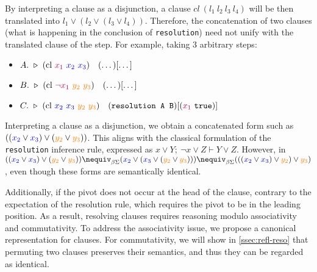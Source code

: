 \begin{remark}
By interpreting a clause as a disjunction, a clause $cl~(l_1~l_2~l_3~l_4)$ will be then translated into $l_1 \lor (l_2 \lor (l_3 \lor l_4))$.
 Therefore, the concatenation of two clauses (what is happening in the conclusion of \texttt{resolution}) need not unify with the translated clause of the step. For example, taking 3 arbitrary steps:

\begin{itemize}
    \setlength{\itemsep}{5pt}
    \setlength{\parskip}{0pt}
    \item[] $A.~\triangleright~(\text{cl}~\textcolor{purple}{x_1}~\textcolor{blue}{x_2~x_3}) \quad (\dots)[\dots]$
    \item[] $B.~\triangleright~ (\text{cl}~\textcolor{purple}{\neg x_1}~\textcolor{orange}{y_2}~\textcolor{orange}{y_3}) \quad  (\dots)[\dots]$
    \item[] $C.~\triangleright~(\text{cl}~\textcolor{blue}{x_2~x_3}~\textcolor{orange}{y_2~y_3}) \quad (\texttt{resolution A B})[(\textcolor{purple}{x_1}~\texttt{true})]$
\end{itemize}

Interpreting a clause as a disjunction, we obtain a concatenated form such as $((\textcolor{blue}{x_2} \lor \textcolor{blue}{x_3}) \lor (\textcolor{orange}{y_2} \lor \textcolor{orange}{y_3}))$.
This aligns with the classical formulation of the \texttt{resolution} inference rule, expressed as $x \lor Y;\ \neg x \lor Z \vdash Y \lor Z$.
However, in {\lpm} $((\textcolor{blue}{x_2} \lor \textcolor{blue}{x_3}) \lor (\textcolor{orange}{y_2} \lor \textcolor{orange}{y_3})) \nequiv_{\beta\Sigma} (\textcolor{blue}{x_2} \lor (\textcolor{blue}{x_3} \lor (\textcolor{orange}{y_2} \lor \textcolor{orange}{y_3})))
\nequiv_{\beta\Sigma} (((\textcolor{blue}{x_2} \lor \textcolor{blue}{x_3}) \lor \textcolor{orange}{y_2}) \lor \textcolor{orange}{y_3})$ , even though these forms are semantically identical.

Additionally, if the pivot does not occur at the head of the clause, contrary to the expectation of the resolution rule,
which requires the pivot to be in the leading position. As a result, resolving clauses requires reasoning modulo associativity and commutativity.
To address the associativity issue, we propose a canonical representation for clauses.
For commutativity, we will show in \cref{ssec:refl-reso} that permuting two clauses preserves their semantics, and thus they can be regarded as identical.

\end{remark}

